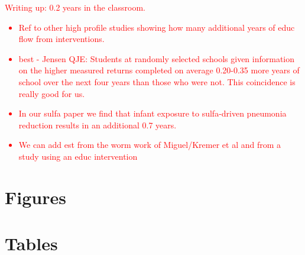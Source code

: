 \documentclass[subeqn]{article}
\newcommand{\twinfolder}{"/home/damian/investigacion/Activa/Twins"}
\begin{document}
\begin{spacing}{1.4}
\textcolor{red}{ Writing up: 0.2 years in the classroom.
\begin{itemize}
\item Ref to other high profile studies showing how many additional years of 
educ flow from interventions.
\item  best - Jensen QJE: Students at randomly selected schools given 
information on the higher measured returns completed on average 0.20-0.35 more 
years of school over the next four years than those who were not. This 
coincidence is really good for us.
\item In our sulfa paper we find that infant exposure to sulfa-driven pneumonia 
reduction results in an additional 0.7 years.
\item We can add est from the worm work of Miguel/Kremer et al and from a study 
using an educ intervention
\end{itemize}
}





\newpage
\section*{Figures}


\clearpage
\section*{Tables}

\clearpage

\clearpage





\begin{landscape}

\end{landscape}





\clearpage




\end{spacing}
\end{document}
